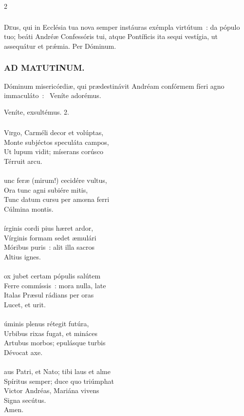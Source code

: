 \documentclass[9pt,twoside]{extarticle}
\begin{document}
\begin{multicols}{2}
{\subsubsection*{\center {}}
\lettrine{D}eus, qui in Ecclésia tua nova semper instáuras exémpla virtútum~: da pópulo tuo; beáti Andréæ Confessóris tui, atque Pontíficis ita sequi vestígia, ut assequátur et prǽmia. Per Dóminum.

\subsubsection*{\center \textsc{AD MATUTINUM.}}
\begin{tightlist}{}
\item {} Dóminum misericórdiæ, qui prædestinávit Andréam confórmem fíeri agno immaculáto~: \textred{*}~Veníte adorémus.
\item {} Veníte, exsultémus. 2.
\end{tightlist}

\subsubsection*{\center {}}
\lettrine{V}irgo, Carméli decor et volúptas,\\
Monte subjéctos speculáta campos,\\
Ut lupum vidit; míserans corúsco\\
Térruit arcu.\\
\\
unc feræ (mirum!) cecidére vultus,\\
Ora tunc agni subiére mitis,\\
Tunc datum cursu per amœna ferri\\
Cúlmina montis.\\
\\
írginis cordi pius hæret ardor,\\
Vírginis formam sedet æmulári\\
Móribus puris~: alit illa sacros\\
Altius ignes.\\
\\
ox jubet certam pópulis salútem\\
Ferre commíssis~: mora nulla, late\\
Italas Præsul rádians per oras\\
Lucet, et urit.\\
\\
úminis plenus rétegit futúra,\\
Urbibus rixas fugat, et mináces\\
Artubus morbos; epulásque turbis\\
Dévocat axe.\\
\\
aus Patri, et Nato; tibi laus et alme\\
Spíritus semper; duce quo triúmphat\\
Victor Andréas, Mariána vivens\\
Signa secútus.\\
Amen.

}
\end{multicols}
\end{document}
